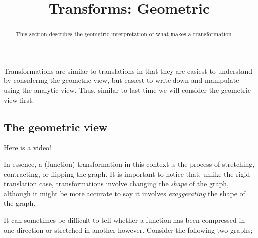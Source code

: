 \documentclass{ximera}
\title{Transforms: Geometric}
\begin{document}
\begin{abstract}
    This section describes the geometric interpretation of what makes a transformation%
\end{abstract}
\maketitle
Transformations are similar to translations in that they are easiest to understand by considering the geometric view, but easiest to write down and manipulate using the analytic view. Thus, similar to last time we will consider the geometric view first.

\subsection*{The geometric view}
    
    Here is a video!
    
    
    In essence, a (function) transformation in this context is the process of stretching, contracting, or flipping the graph. It is important to notice that, unlike the rigid translation case, transformations involve changing the \textit{shape} of the graph, although it might be more accurate to say it involves \textit{exaggerating} the shape of the graph.
    
    It can sometimes be difficult to tell whether a function has been compressed in one direction or stretched in another however. Consider the following two graphs;
    
\end{document}
